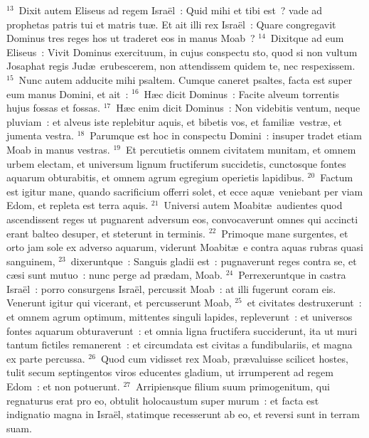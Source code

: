 ${}^{13}$~Dixit autem Eliseus ad regem Isra\"el~: Quid mihi et tibi est~? vade ad prophetas patris tui et matris tu\ae . Et ait illi rex Isra\"el~: Quare congregavit Dominus tres reges hos ut traderet eos in manus Moab~?
${}^{14}$~Dixitque ad eum Eliseus~: Vivit Dominus exercituum, in cujus conspectu sto, quod si non vultum Josaphat regis Jud\ae\ erubescerem, non attendissem quidem te, nec respexissem.
${}^{15}$~Nunc autem adducite mihi psaltem. Cumque caneret psaltes, facta est super eum manus Domini, et ait~:
${}^{16}$~H\ae c dicit Dominus~: Facite alveum torrentis hujus fossas et fossas.
${}^{17}$~H\ae c enim dicit Dominus~: Non videbitis ventum, neque pluviam~: et alveus iste replebitur aquis, et bibetis vos, et famili\ae\ vestr\ae , et jumenta vestra.
${}^{18}$~Parumque est hoc in conspectu Domini~: insuper tradet etiam Moab in manus vestras.
${}^{19}$~Et percutietis omnem civitatem munitam, et omnem urbem electam, et universum lignum fructiferum succidetis, cunctosque fontes aquarum obturabitis, et omnem agrum egregium operietis lapidibus.
${}^{20}$~Factum est igitur mane, quando sacrificium offerri solet, et ecce aqu\ae\ veniebant per viam Edom, et repleta est terra aquis.
${}^{21}$~Universi autem Moabit\ae\ audientes quod ascendissent reges ut pugnarent adversum eos, convocaverunt omnes qui accincti erant balteo desuper, et steterunt in terminis.
${}^{22}$~Primoque mane surgentes, et orto jam sole ex adverso aquarum, viderunt Moabit\ae\ e contra aquas rubras quasi sanguinem,
${}^{23}$~dixeruntque~: Sanguis gladii est~: pugnaverunt reges contra se, et c\ae si sunt mutuo~: nunc perge ad pr\ae dam, Moab.
${}^{24}$~Perrexeruntque in castra Isra\"el~: porro consurgens Isra\"el, percussit Moab~: at illi fugerunt coram eis. Venerunt igitur qui vicerant, et percusserunt Moab,
${}^{25}$~et civitates destruxerunt~: et omnem agrum optimum, mittentes singuli lapides, repleverunt~: et universos fontes aquarum obturaverunt~: et omnia ligna fructifera succiderunt, ita ut muri tantum fictiles remanerent~: et circumdata est civitas a fundibulariis, et magna ex parte percussa.
${}^{26}$~Quod cum vidisset rex Moab, pr\ae valuisse scilicet hostes, tulit secum septingentos viros educentes gladium, ut irrumperent ad regem Edom~: et non potuerunt.
${}^{27}$~Arripiensque filium suum primogenitum, qui regnaturus erat pro eo, obtulit holocaustum super murum~: et facta est indignatio magna in Isra\"el, statimque recesserunt ab eo, et reversi sunt in terram suam.

